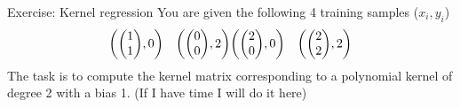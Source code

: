 \begin{parag}{Exercise: Kernel regression}
    You are given the following 4 training samples ($x_i, y_i$)
	\begin{align*} 
		\left(\begin{pmatrix} 1 \\ 1 \end{pmatrix} , 0\right) \mathspace \left(\begin{pmatrix} 0 \\ 0 \end{pmatrix} , 2\right)  \left(\begin{pmatrix} 2 \\ 0 \end{pmatrix} , 0\right) \mathspace \left(\begin{pmatrix} 2 \\ 2 \end{pmatrix} , 2\right)
	\end{align*}
	The task is to compute the kernel matrix corresponding to a polynomial kernel of degree 2 with a bias 1. (If I have time I will do it here)
\end{parag}


